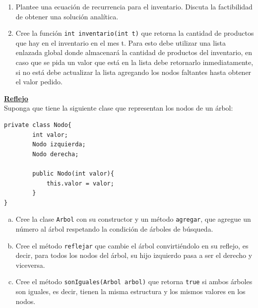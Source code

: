 \documentclass[dcc,uchile,sol]{fcfmcourse}
\newcommand{\ptitle}[1]{\underline{\textbf{#1}}}
\begin{document}
\begin{problems}
\begin{enumerate}
    \item Plantee una ecuación de recurrencia para el inventario. Discuta la factibilidad de obtener una solución analítica.
    \item Cree la función \texttt{int inventario(int t)} que retorna la cantidad de productos que hay en el inventario en el mes t. Para esto debe utilizar una lista enlazada global donde almacenará la cantidad de productos del inventario, en caso que se pida un valor que está en la lista debe retornarlo inmediatamente, si no está debe actualizar la lista agregando los nodos faltantes hasta obtener el valor pedido.
\end{enumerate}

\problem \ptitle{Reflejo}\\
Suponga que tiene la siguiente clase que representan los nodos de un árbol:
\begin{lstlisting}
private class Nodo{
        int valor;
        Nodo izquierda;
        Nodo derecha;

        public Nodo(int valor){
            this.valor = valor;
        }
}
\end{lstlisting}
\begin{enumerate}[a)]
    \item Cree la clase \texttt{Arbol} con su constructor y un método \texttt{agregar}, que agregue un número al árbol respetando la condición de árboles de búsqueda.
    \item Cree el método \texttt{reflejar} que cambie el árbol convirtiéndolo en su reflejo, es decir, para todos los nodos del árbol, su hijo izquierdo pasa a ser el derecho y viceversa.
    \item Cree el método \texttt{sonIguales(Arbol arbol)} que retorna \texttt{true} si ambos árboles son iguales, es decir, tienen la misma estructura y los mismos valores en los nodos.
\end{enumerate}

\end{problems}
\end{document}
